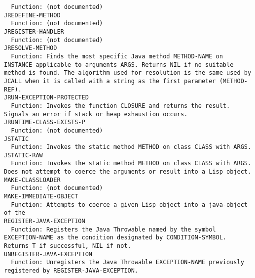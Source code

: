 \begin{verbatim}
  Function: (not documented)
JREDEFINE-METHOD
  Function: (not documented)
JREGISTER-HANDLER
  Function: (not documented)
JRESOLVE-METHOD
  Function: Finds the most specific Java method METHOD-NAME on INSTANCE applicable to arguments ARGS. Returns NIL if no suitable method is found. The algorithm used for resolution is the same used by JCALL when it is called with a string as the first parameter (METHOD-REF).
JRUN-EXCEPTION-PROTECTED
  Function: Invokes the function CLOSURE and returns the result.  Signals an error if stack or heap exhaustion occurs.
JRUNTIME-CLASS-EXISTS-P
  Function: (not documented)
JSTATIC
  Function: Invokes the static method METHOD on class CLASS with ARGS.
JSTATIC-RAW
  Function: Invokes the static method METHOD on class CLASS with ARGS. Does not attempt to coerce the arguments or result into a Lisp object.
MAKE-CLASSLOADER
  Function: (not documented)
MAKE-IMMEDIATE-OBJECT
  Function: Attempts to coerce a given Lisp object into a java-object of the
REGISTER-JAVA-EXCEPTION
  Function: Registers the Java Throwable named by the symbol EXCEPTION-NAME as the condition designated by CONDITION-SYMBOL.  Returns T if successful, NIL if not.
UNREGISTER-JAVA-EXCEPTION
  Function: Unregisters the Java Throwable EXCEPTION-NAME previously registered by REGISTER-JAVA-EXCEPTION.
\end{verbatim}
